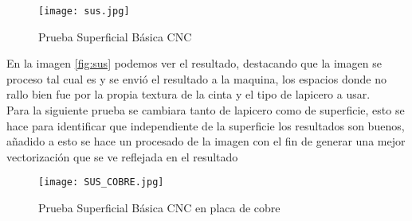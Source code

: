 \documentclass[conference]{IEEEtran}
\begin{document}
 \begin{figure}[htb]
        \centering
        \texttt{[image: sus.jpg]}
        \caption{Prueba Superficial Básica CNC }
        \end{figure}
En la imagen \ref{fig:sus} podemos ver el resultado, destacando que la imagen se proceso tal cual es y se envió el resultado a la maquina, los espacios donde no rallo bien fue por la propia textura de la cinta y el tipo de lapicero a usar.\\

Para la siguiente prueba se cambiara tanto de lapicero como de superficie, esto se hace para identificar que independiente de la superficie los resultados son buenos, añadido a esto se hace un procesado de la imagen con el fin de generar una mejor vectorización que se ve reflejada en el resultado

 \begin{figure}[htb]
        \centering
        \texttt{[image: SUS\_COBRE.jpg]}
        \caption{Prueba Superficial Básica CNC en placa de cobre }
        \end{figure}
\end{document}
